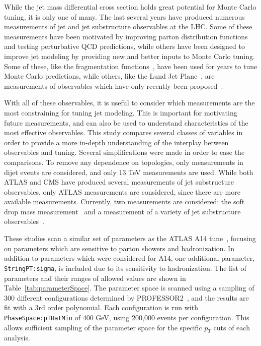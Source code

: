 While the jet mass differential cross section holds great potential for Monte Carlo tuning, it is only one of many.  The last several years have produced numerous measurements of jet and jet substructure observables at the LHC. 
Some of these measurements have been motivated by improving parton distribution functions and testing perturbative QCD predictions, 
while others have been designed to improve jet modeling by providing new and better inputs to Monte Carlo tuning.
Some of these, like the fragmentation functions~\cite{Aad:2019onw}, have been used for years to tune Monte Carlo predictions, 
while others, like the Lund Jet Plane~\cite{lundAtlas}, are measurements of observables which have only recently been proposed~\cite{lundPlane}.

With all of these observables, it is useful to consider which measurements are the most constraining for tuning jet modeling.
This is important for motivating future measurements, and can also be used to understand characteristics of the most effective observables.
This study compares several classes of variables in order to provide a more in-depth understanding of the interplay between observables and tuning.
Several simplifications were made in order to ease the comparisons. 
To remove any dependence on topologies, only measurements in dijet events are considered, and only 13 TeV measurements are used.
While both ATLAS and CMS have produced several measurements of jet substructure observables, only ATLAS measurements are considered, since there are more available measurements.
Currently, two measurements are considered: the soft drop mass measurement~\cite{Aaboud:2017qwh} and a measurement of a variety of jet substructure observables~\cite{Aaboud:2019aii}.


These studies scan a similar set of parameters as the ATLAS A14 tune~\cite{ATL-PHYS-PUB-2014-021}, focusing on parameters which are sensitive to parton showers and hadronization.
In addition to parameters which were considered for A14, one additional parameter, \texttt{StringPT:sigma}, is included due to its sensitivity to hadronization.
The list of parameters and their ranges of allowed values are shown in Table~\ref{tab:parameterSpace}.
The parameter space is scanned using a sampling of 300 different configurations determined by PROFESSOR2~\cite{Buckley:2009bj}, and the results are fit with a 3rd order polynomial.
Each configuration is run with \texttt{PhaseSpace:pTHatMin} of 400 GeV, using 200,000 events per configuration. 
This allows sufficient sampling of the parameter space for the specific $p_{T}$ cuts of each analysis. 

